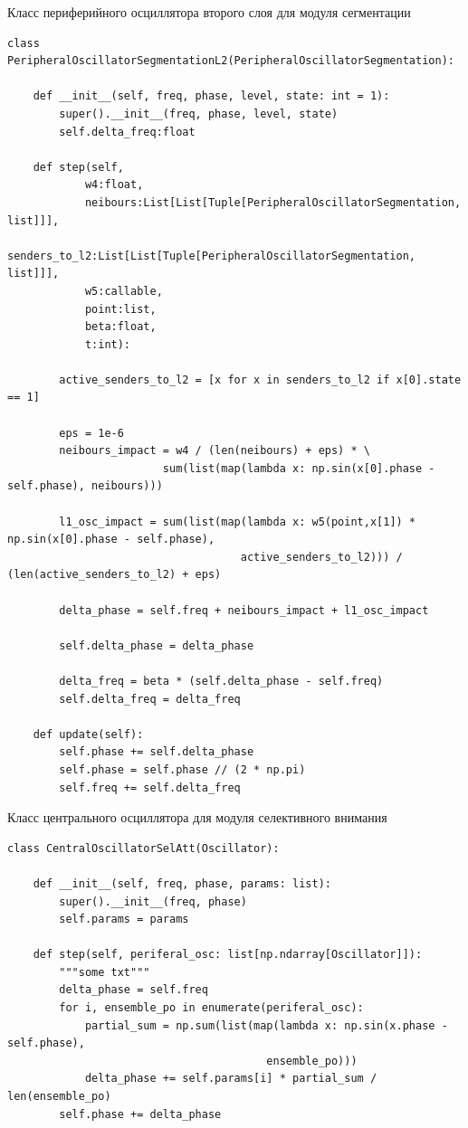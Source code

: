 \documentclass[14pt, russian]{scrartcl}
\begin{document}
\begin{listing}[!htt]
    \caption{Класс периферийного осциллятора второго слоя для модуля сегментации}
    \label{lst:contour_extr_sobel}
    \begin{verbatim}
class PeripheralOscillatorSegmentationL2(PeripheralOscillatorSegmentation):

    def __init__(self, freq, phase, level, state: int = 1):
        super().__init__(freq, phase, level, state)
        self.delta_freq:float

    def step(self,
            w4:float,
            neibours:List[List[Tuple[PeripheralOscillatorSegmentation, list]]],
            senders_to_l2:List[List[Tuple[PeripheralOscillatorSegmentation, list]]],
            w5:callable,
            point:list,
            beta:float,
            t:int):
        
        active_senders_to_l2 = [x for x in senders_to_l2 if x[0].state == 1]
        
        eps = 1e-6
        neibours_impact = w4 / (len(neibours) + eps) * \
                        sum(list(map(lambda x: np.sin(x[0].phase - self.phase), neibours)))
        
        l1_osc_impact = sum(list(map(lambda x: w5(point,x[1]) * np.sin(x[0].phase - self.phase),  
                                    active_senders_to_l2))) / (len(active_senders_to_l2) + eps)
        
        delta_phase = self.freq + neibours_impact + l1_osc_impact

        self.delta_phase = delta_phase

        delta_freq = beta * (self.delta_phase - self.freq)
        self.delta_freq = delta_freq

    def update(self):
        self.phase += self.delta_phase
        self.phase = self.phase // (2 * np.pi)
        self.freq += self.delta_freq
    \end{verbatim}
\end{listing}

\begin{listing}[!htt]
    \caption{Класс центрального осциллятора для модуля селективного внимания}
    \label{lst:contour_extr_sobel}
    \begin{verbatim}
class CentralOscillatorSelAtt(Oscillator):

    def __init__(self, freq, phase, params: list):
        super().__init__(freq, phase)
        self.params = params

    def step(self, periferal_osc: list[np.ndarray[Oscillator]]):
        """some txt"""
        delta_phase = self.freq
        for i, ensemble_po in enumerate(periferal_osc):   
            partial_sum = np.sum(list(map(lambda x: np.sin(x.phase - self.phase),
                                        ensemble_po)))
            delta_phase += self.params[i] * partial_sum / len(ensemble_po)
        self.phase += delta_phase
    \end{verbatim}
\end{listing}
\end{document}

